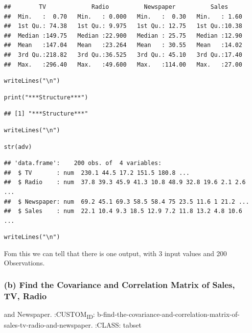 \documentclass[11pt]{article}
\begin{document}
\begin{verbatim}
##        TV             Radio          Newspaper          Sales      
##  Min.   :  0.70   Min.   : 0.000   Min.   :  0.30   Min.   : 1.60  
##  1st Qu.: 74.38   1st Qu.: 9.975   1st Qu.: 12.75   1st Qu.:10.38  
##  Median :149.75   Median :22.900   Median : 25.75   Median :12.90  
##  Mean   :147.04   Mean   :23.264   Mean   : 30.55   Mean   :14.02  
##  3rd Qu.:218.82   3rd Qu.:36.525   3rd Qu.: 45.10   3rd Qu.:17.40  
##  Max.   :296.40   Max.   :49.600   Max.   :114.00   Max.   :27.00
\end{verbatim}

\begin{verbatim}
writeLines("\n")
\end{verbatim}

\begin{verbatim}
print("***Structure***")
\end{verbatim}

\begin{verbatim}
## [1] "***Structure***"
\end{verbatim}

\begin{verbatim}
writeLines("\n")
\end{verbatim}

\begin{verbatim}
str(adv)
\end{verbatim}

\begin{verbatim}
## 'data.frame':    200 obs. of  4 variables:
##  $ TV       : num  230.1 44.5 17.2 151.5 180.8 ...
##  $ Radio    : num  37.8 39.3 45.9 41.3 10.8 48.9 32.8 19.6 2.1 2.6 ...
##  $ Newspaper: num  69.2 45.1 69.3 58.5 58.4 75 23.5 11.6 1 21.2 ...
##  $ Sales    : num  22.1 10.4 9.3 18.5 12.9 7.2 11.8 13.2 4.8 10.6 ...
\end{verbatim}

\begin{verbatim}
writeLines("\n")
\end{verbatim}

Fom this we can tell that there is one output, with 3 input values and
200 Observations.

\subsubsection{}
\label{sec:org242e409}

\subsubsection{(b) Find the Covariance and Correlation Matrix of Sales, TV, Radio}
\label{sec:orgf99150e}
and Newspaper.
:CUSTOM\textsubscript{ID}: b-find-the-covariance-and-correlation-matrix-of-sales-tv-radio-and-newspaper.
:CLASS: tabset
\end{document}

